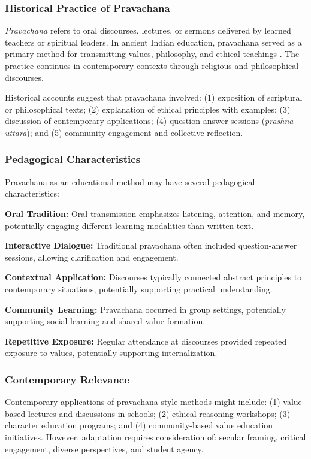 \documentclass[12pt,a4paper,twocolumn]{article}
\begin{document}
\subsubsection{Historical Practice of Pravachana}

\textit{Pravachana} refers to oral discourses, lectures, or sermons delivered by learned teachers or spiritual leaders. In ancient Indian education, pravachana served as a primary method for transmitting values, philosophy, and ethical teachings \citep{Keay1951}. The practice continues in contemporary contexts through religious and philosophical discourses.

Historical accounts suggest that pravachana involved: (1) exposition of scriptural or philosophical texts; (2) explanation of ethical principles with examples; (3) discussion of contemporary applications; (4) question-answer sessions (\textit{prashna-uttara}); and (5) community engagement and collective reflection.

\subsubsection{Pedagogical Characteristics}

Pravachana as an educational method may have several pedagogical characteristics:

\textbf{Oral Tradition:} Oral transmission emphasizes listening, attention, and memory, potentially engaging different learning modalities than written text.

\textbf{Interactive Dialogue:} Traditional pravachana often included question-answer sessions, allowing clarification and engagement.

\textbf{Contextual Application:} Discourses typically connected abstract principles to contemporary situations, potentially supporting practical understanding.

\textbf{Community Learning:} Pravachana occurred in group settings, potentially supporting social learning and shared value formation.

\textbf{Repetitive Exposure:} Regular attendance at discourses provided repeated exposure to values, potentially supporting internalization.

\subsubsection{Contemporary Relevance}

Contemporary applications of pravachana-style methods might include: (1) value-based lectures and discussions in schools; (2) ethical reasoning workshops; (3) character education programs; and (4) community-based value education initiatives. However, adaptation requires consideration of: secular framing, critical engagement, diverse perspectives, and student agency.
\end{document}
